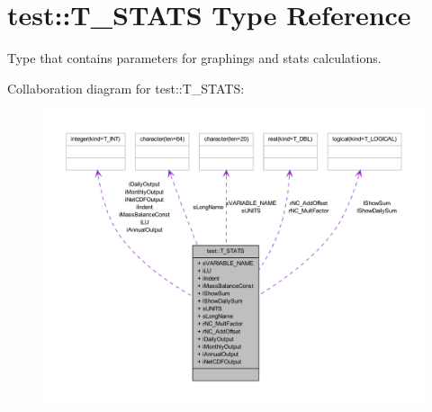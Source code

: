 \hypertarget{typetest_1_1_t___s_t_a_t_s}{
\section{test::T\_\-STATS Type Reference}
\label{typetest_1_1_t___s_t_a_t_s}
}


Type that contains parameters for graphings and stats calculations.  




Collaboration diagram for test::T\_\-STATS:\nopagebreak
\begin{figure}[H]
\begin{center}
\leavevmode
\includegraphics[width=400pt]{typetest_1_1_t___s_t_a_t_s__coll__graph}
\end{center}
\end{figure}

